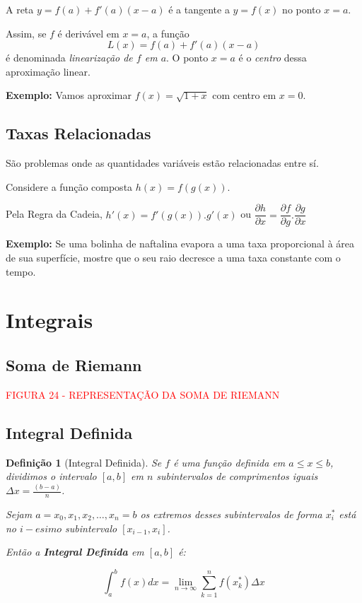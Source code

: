 \documentclass[oneside,a4paper,12pt]{article}
\newtheorem{definition}{Definição}[section]
\begin{document}
\vspace{300pt}

A reta $y = f(a) + f'(a)(x-a)$ é a tangente a $y = f(x)$ no ponto $x = a$.

\vspace{250pt}

Assim, se $f$ é derivável em $x = a$, a função $$L(x) = f(a) + f'(a)(x-a)$$ é denominada \emph{linearização de $f$ em $a$}. O ponto $x = a$ é o \emph{centro} dessa aproximação linear.

{\bf Exemplo: }Vamos aproximar $f(x) = \sqrt{1 + x}$ com centro em $x = 0$.

\newpage

\subsection{Taxas Relacionadas}
São problemas onde as quantidades variáveis estão relacionadas entre sí.

Considere a função composta $h(x) = f(g(x))$.

Pela Regra da Cadeia, $h'(x) = f'(g(x)).g'(x)$ ou $\dfrac{\partial h}{\partial x} = \dfrac{\partial f}{\partial g} . \dfrac{\partial g}{\partial x}$

{\bf Exemplo: } Se uma bolinha de naftalina evapora a uma taxa proporcional à área de sua superfície, mostre que o seu raio decresce a uma taxa constante com o tempo.
\newpage


\section{Integrais}

\subsection{Soma de Riemann}


\vspace{220pt}
\begin{center}
	\textcolor{red}{FIGURA 24 - REPRESENTAÇÃO DA SOMA DE RIEMANN}
\end{center}

\subsection{Integral Definida}
\begin{definition}[Integral Definida]
	Se $f$ é uma função definida em $a \leq x \leq b$, dividimos o intervalo $[a,b]$ em $n$ subintervalos de comprimentos iguais $\Delta x = \frac{(b-a)}{n}$.
	
	Sejam $a = x_0, x_1, x_2, \dots, x_n = b$ os extremos desses subintervalos de forma $x^{*}_i$ está no $i-esimo$ subintervalo $[x_{i-1},x_i]$.
	
	Então a {\bf Integral Definida} em $[a,b]$ é:
	
	$$\int_{a}^{b}f(x)dx = \lim\limits_{n \rightarrow \infty}\sum_{k=1}^{n}f(x_{k}^{*})\Delta x$$
\end{definition}
\end{document}
